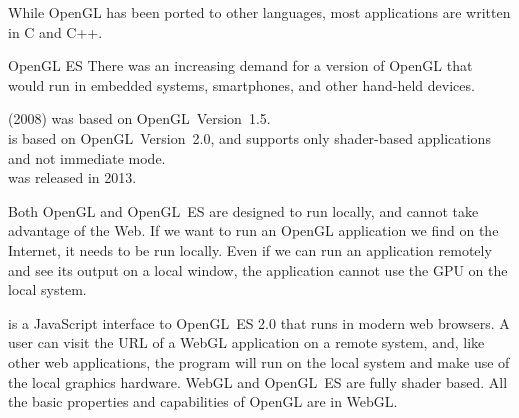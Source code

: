 \documentclass[../COS3712_Notes.tex]{subfiles}
\begin{document}
      While OpenGL has been ported to other languages,
      most applications are written in C and C++.

      \begin{definition}{OpenGL ES}
        There was an increasing demand for a version of OpenGL
        that would run in embedded systems, smartphones,
        and other hand-held devices.

         (2008) was based on OpenGL~Version~1.5.\\
         is based on OpenGL~Version~2.0,
        and supports only shader-based applications and not immediate mode.\\
         was released in 2013.
      \end{definition}

      Both OpenGL and OpenGL~ES are designed to run locally,
      and cannot take advantage of the Web.
      If we want to run an OpenGL application we find on the Internet,
      it needs to be run locally.
      Even if we can run an application remotely and see its output on a local window,
      the application cannot use the GPU on the local system.

       is a JavaScript interface to OpenGL~ES 2.0
      that runs in modern web browsers.
      A user can visit the URL of a WebGL application on a remote system,
      and, like other web applications,
      the program will run on the local system and make use of the local graphics hardware.
      WebGL and OpenGL~ES are fully shader based.
      All the basic properties and capabilities of OpenGL are in WebGL.

\end{document}
